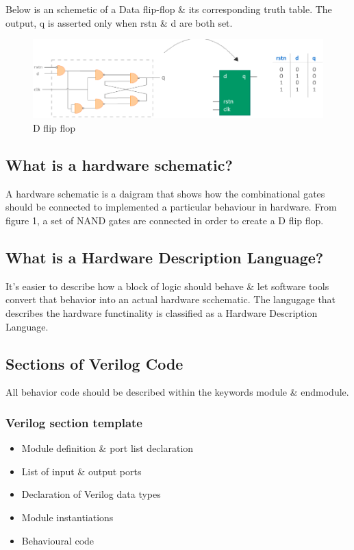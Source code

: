 \documentclass{article}
\begin{document}
	Below is an schemetic of a Data flip-flop \& its corresponding truth table. The output, q is asserted only when rstn \& d are both set. \newline

	\begin{figure}[H]
		\includegraphics[width=\linewidth]{VerilogPics/figure_1.png}
		\caption{D flip flop}
		\label{D Flip-flop schematic and logic}
	\end{figure}

	\subsection{What is a hardware schematic?}

	A hardware schematic is a daigram that shows how the combinational gates should be connected to implemented a particular behaviour in hardware. From figure 1, a set of NAND gates are connected in order to create a D flip flop. 

	\subsection{What is a Hardware Description Language?}

	It's easier to describe how a block of logic should behave \& let software tools convert that behavior into an actual hardware scchematic. The langugage that describes the hardware functinality is classified as a Hardware Description Language.

	\subsection{Sections of Verilog Code}

	All behavior code should be described within the keywords module \& endmodule. 

	\subsubsection{Verilog section template}
	\begin{itemize}
		\item Module definition \& port list declaration
		\item List of input \& output ports
		\item Declaration of Verilog data types
		\item Module instantiations
		\item Behavioural code
	\end{itemize}
\end{document}
